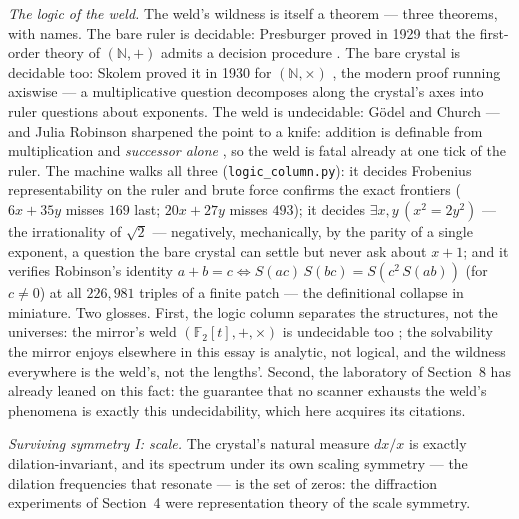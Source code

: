 \documentclass[11pt]{article}
\theoremstyle{remark}
\begin{document}
\emph{The logic of the weld.} The weld's wildness is itself a theorem --- three theorems, with
names. The bare ruler is decidable: Presburger proved in 1929 that the first-order theory of
$(\mathbb{N}, +)$ admits a decision procedure \cite{Presburger}. The bare crystal is decidable
too: Skolem proved it in 1930 for $(\mathbb{N}, \times)$ \cite{Skolem}, the modern proof running
axiswise --- a multiplicative question decomposes along the crystal's axes into ruler questions
about exponents. The weld is undecidable: G\"odel and Church \cite{Godel, Church} --- and Julia
Robinson sharpened the point to a knife: addition is definable from multiplication and
\emph{successor alone} \cite{JRobinson}, so the weld is fatal already at one tick of the ruler.
The machine walks all three (\texttt{logic\_column.py}): it decides Frobenius representability on
the ruler and brute force confirms the exact frontiers ($6x + 35y$ misses $169$ last; $20x + 27y$
misses $493$); it decides $\exists x, y\,(x^2 = 2y^2)$ --- the irrationality of $\sqrt{2}$ ---
negatively, mechanically, by the parity of a single exponent, a question the bare crystal can
settle but never ask about $x + 1$; and it verifies Robinson's identity
$a + b = c \iff S(ac)\,S(bc) = S(c^2\,S(ab))$ (for $c \neq 0$) at all $226{,}981$ triples of a
finite patch --- the definitional collapse in miniature. Two glosses. First, the logic column
separates the structures, not the universes: the mirror's weld $(\mathbb{F}_2[t], +, \times)$ is
undecidable too \cite{RRobinson}; the solvability the mirror enjoys elsewhere in this essay is
analytic, not logical, and the wildness everywhere is the weld's, not the lengths'. Second, the
laboratory of Section~8 has already leaned on this fact: the guarantee that no scanner exhausts
the weld's phenomena is exactly this undecidability, which here acquires its citations.

\emph{Surviving symmetry I: scale.} The crystal's natural measure $dx/x$ is exactly
dilation-invariant, and its spectrum under its own scaling symmetry --- the dilation frequencies that
resonate --- is the set of zeros: the diffraction experiments of Section~4 were representation theory
of the scale symmetry.
\end{document}
